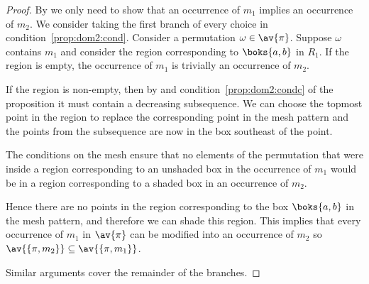 \begin{proof}
    By  we only need to show that an occurrence of
    \(m_1\) implies an occurrence of \(m_2\). We consider taking the first
    branch of every choice in condition~\eqref{prop:dom2:cond}. Consider a
    permutation \(\omega \in \av{\pi}\). Suppose \(\omega\) contains \(m_1\) and
    consider the region corresponding to \(\boks{a,b}\) in \(R_1\). If the
    region is empty, the occurrence of \(m_1\) is trivially an occurrence of
    \(m_2\).

    If the region is non-empty, then by  and
    condition~\eqref{prop:dom2:condc} of the proposition it must contain a
    decreasing subsequence. We can choose the topmost point in the region to
    replace the corresponding point in the mesh pattern and the points from the
    subsequence are now in the box southeast of the point.

    The conditions on the mesh ensure that no elements of the permutation that
    were inside a region corresponding to an unshaded box in the occurrence of
    \(m_1\) would be in a region corresponding to a shaded box in an occurrence
    of \(m_2\).

    Hence there are no points in the region corresponding to the box
    \(\boks{a,b}\) in the mesh pattern, and therefore we can shade this region.
    This implies that every occurrence of \(m_1\) in \(\av{\pi}\) can be
    modified into an occurrence of \(m_2\) so \(\av{\{\pi,m_2\}} \subseteq
    \av{\{\pi,m_1\}}\).

    Similar arguments cover the remainder of the branches.
\end{proof}

